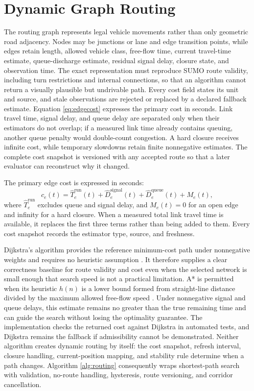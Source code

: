 \section{Dynamic Graph Routing}

The routing graph represents legal vehicle movements rather than only geometric road adjacency. Nodes may be junctions or lane and edge transition points, while edges retain length, allowed vehicle class, free-flow time, current travel-time estimate, queue-discharge estimate, residual signal delay, closure state, and observation time. The exact representation must reproduce SUMO route validity, including turn restrictions and internal connections, so that an algorithm cannot return a visually plausible but undrivable path. Every cost field states its unit and source, and stale observations are rejected or replaced by a declared fallback estimate. Equation \ref{eq:edgecost} expresses the primary cost in seconds. Link travel time, signal delay, and queue delay are separated only when their estimators do not overlap; if a measured link time already contains queuing, another queue penalty would double-count congestion. A hard closure receives infinite cost, while temporary slowdowns retain finite nonnegative estimates. The complete cost snapshot is versioned with any accepted route so that a later evaluator can reconstruct why it changed.

The primary edge cost is expressed in seconds:
\begin{equation}
c_e(t)=\hat{T}^{\mathrm{run}}_e(t)+\hat{D}^{\mathrm{signal}}_e(t)+\hat{D}^{\mathrm{queue}}_e(t)+M_e(t),
\label{eq:edgecost}
\end{equation}
where $\hat{T}^{\mathrm{run}}_e$ excludes queue and signal delay, and $M_e(t)=0$ for an open edge and infinity for a hard closure. When a measured total link travel time is available, it replaces the first three terms rather than being added to them. Every cost snapshot records the estimator type, source, and freshness.

Dijkstra's algorithm provides the reference minimum-cost path under nonnegative weights and requires no heuristic assumption \cite{dijkstra1959}. It therefore supplies a clear correctness baseline for route validity and cost even when the selected network is small enough that search speed is not a practical limitation. A* is permitted when its heuristic $h(n)$ is a lower bound formed from straight-line distance divided by the maximum allowed free-flow speed \cite{hart1968astar}. Under nonnegative signal and queue delays, this estimate remains no greater than the true remaining time and can guide the search without losing the optimality guarantee. The implementation checks the returned cost against Dijkstra in automated tests, and Dijkstra remains the fallback if admissibility cannot be demonstrated. Neither algorithm creates dynamic routing by itself: the cost snapshot, refresh interval, closure handling, current-position mapping, and stability rule determine when a path changes. Algorithm \ref{alg:routing} consequently wraps shortest-path search with validation, no-route handling, hysteresis, route versioning, and corridor cancellation.

